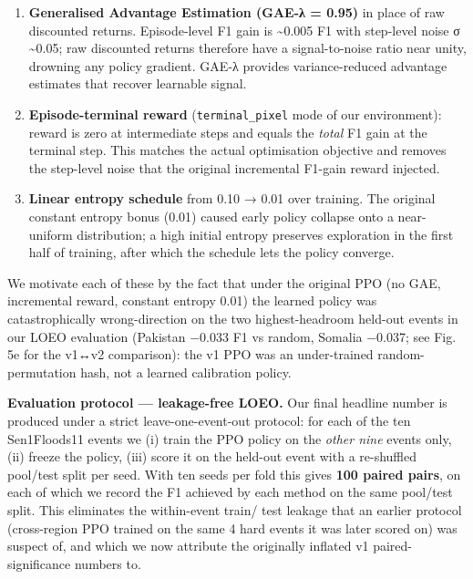 \begin{enumerate}
\def\labelenumi{\arabic{enumi}.}
\tightlist
\item
  \textbf{Generalised Advantage Estimation (GAE-λ = 0.95)} in place of raw
  discounted returns. Episode-level F1 gain is \textasciitilde0.005 F1 with step-level
  noise σ \textasciitilde0.05; raw discounted returns therefore have a signal-to-noise
  ratio near unity, drowning any policy gradient. GAE-λ provides
  variance-reduced advantage estimates that recover learnable signal.
\item
  \textbf{Episode-terminal reward} (\texttt{terminal\_pixel} mode of our environment):
  reward is zero at intermediate steps and equals the \emph{total} F1 gain at
  the terminal step. This matches the actual optimisation objective and
  removes the step-level noise that the original incremental F1-gain
  reward injected.
\item
  \textbf{Linear entropy schedule} from 0.10 → 0.01 over training. The original
  constant entropy bonus (0.01) caused early policy collapse onto a
  near-uniform distribution; a high initial entropy preserves exploration
  in the first half of training, after which the schedule lets the policy
  converge.
\end{enumerate}

We motivate each of these by the fact that under the original PPO (no GAE,
incremental reward, constant entropy 0.01) the learned policy was
catastrophically wrong-direction on the two highest-headroom held-out events
in our LOEO evaluation (Pakistan −0.033 F1 vs random, Somalia −0.037; see
Fig. 5e for the v1↔v2 comparison): the v1 PPO was an
under-trained random-permutation hash, not a learned calibration policy.

\textbf{Evaluation protocol --- leakage-free LOEO.} Our final headline number is
produced under a strict leave-one-event-out protocol: for each of the ten
Sen1Floods11 events we (i) train the PPO policy on the \emph{other nine} events
only, (ii) freeze the policy, (iii) score it on the held-out event with a
re-shuffled pool/test split per seed. With ten seeds per fold this gives
\textbf{100 paired pairs}, on each of which we record the F1 achieved by each
method on the same pool/test split. This eliminates the within-event train/
test leakage that an earlier protocol (cross-region PPO trained on the same
4 hard events it was later scored on) was suspect of, and which we now
attribute the originally inflated v1 paired-significance numbers to.

